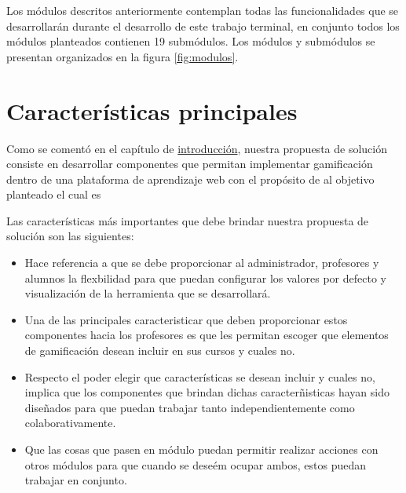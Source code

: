  Los módulos descritos anteriormente contemplan todas las funcionalidades que se desarrollarán
 durante el desarrollo de este trabajo terminal, en conjunto todos los módulos planteados contienen
 19 submódulos. Los módulos y submódulos se presentan organizados en la figura \ref{fig:modulos}.\\

 \clearpage

 \noindent 

\section{Características principales}

 Como se comentó en el capítulo de \hyperref[ch:introduccion]{introducción}, nuestra
 propuesta de solución consiste en desarrollar componentes que permitan implementar
 gamificación dentro de una plataforma de aprendizaje web con el propósito de
 al objetivo planteado el cual es

 Las características más
 importantes que debe brindar nuestra propuesta de solución son las siguientes:

    \begin{multicols}{2}
    \begin{itemize}

    \item[] Hace referencia a que se debe proporcionar al administrador, profesores
            y alumnos la flexbilidad para que puedan configurar los valores por defecto
            y visualización de la herramienta que se desarrollará.


    \item[] Una de las principales caracteristicar que deben proporcionar estos
            componentes hacia los profesores es que les permitan escoger que elementos
            de gamificación desean incluir en sus cursos y cuales no.\\



    \item[] Respecto el poder elegir que características se desean incluir y cuales no,
            implica que los componentes que brindan dichas caracterñisticas hayan sido
            diseñados para que puedan trabajar tanto independientemente como
            colaborativamente.


    \item[] Que las cosas que pasen en módulo puedan permitir realizar acciones con
            otros módulos para que cuando se deseém ocupar ambos, estos puedan trabajar
            en conjunto.

    \end{itemize}
    \end{multicols}
 

